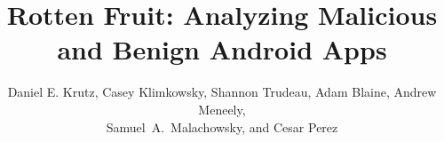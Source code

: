 \documentclass{sig-alternate-05-2015}
\begin{document}


\title{Rotten Fruit: Analyzing Malicious and Benign Android Apps}







\author{
%
\alignauthor
Daniel E. Krutz, Casey Klimkowsky, Shannon Trudeau, Adam Blaine, Andrew Meneely,\\ Samuel~A.~Malachowsky, and Cesar Perez 	\\
       \\
       \alignauthor
} %


\end{document}
